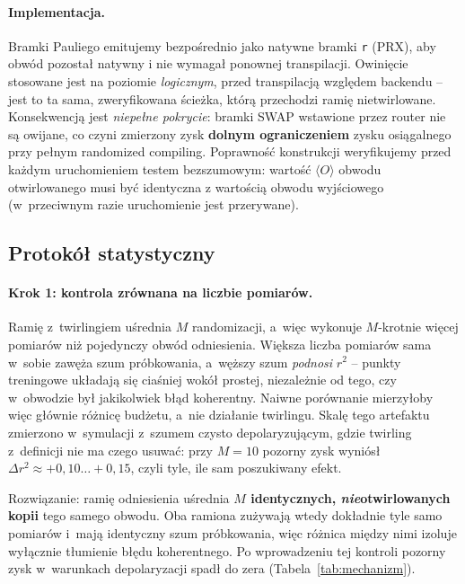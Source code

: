 \documentclass[11pt]{article}
\newcommand{\expv}{\langle O\rangle}
\begin{document}
\paragraph{Implementacja.} Bramki Pauliego emitujemy bezpośrednio jako natywne bramki \texttt{r}
(PRX), aby obwód pozostał natywny i nie wymagał ponownej transpilacji. Owinięcie stosowane jest na poziomie \emph{logicznym}, przed
transpilacją względem backendu -- jest to ta sama, zweryfikowana ścieżka, którą przechodzi ramię
nietwirlowane. Konsekwencją jest \emph{niepełne pokrycie}: bramki SWAP wstawione przez router nie są
owijane, co czyni zmierzony zysk \textbf{dolnym ograniczeniem} zysku osiągalnego przy pełnym
randomized compiling. Poprawność konstrukcji weryfikujemy przed każdym uruchomieniem testem
bezszumowym: wartość $\expv$ obwodu otwirlowanego musi być identyczna z wartością obwodu wyjściowego
(w~przeciwnym razie uruchomienie jest przerywane).

\subsection{Protokół statystyczny}\label{sec:protokol}

\paragraph{Krok 1: kontrola zrównana na liczbie pomiarów.} Ramię z~twirlingiem uśrednia $M$
randomizacji, a~więc wykonuje $M$-krotnie więcej pomiarów niż pojedynczy obwód odniesienia. Większa
liczba pomiarów sama w~sobie zawęża szum próbkowania, a~węższy szum \emph{podnosi} $r^2$ -- punkty
treningowe układają się ciaśniej wokół prostej, niezależnie od tego, czy w~obwodzie był jakikolwiek
błąd koherentny. Naiwne porównanie mierzyłoby więc głównie różnicę budżetu, a~nie działanie
twirlingu. Skalę tego artefaktu zmierzono w~symulacji z~szumem czysto depolaryzującym, gdzie
twirling z~definicji nie ma czego usuwać: przy $M=10$ pozorny zysk wyniósł $\Delta r^2 \approx
+0{,}10\ldots+0{,}15$, czyli tyle, ile sam poszukiwany efekt.

Rozwiązanie: ramię odniesienia uśrednia \textbf{$M$ identycznych, \emph{nie}otwirlowanych kopii}
tego samego obwodu. Oba ramiona zużywają wtedy dokładnie tyle samo pomiarów i~mają identyczny szum
próbkowania, więc różnica między nimi izoluje wyłącznie tłumienie błędu koherentnego. Po
wprowadzeniu tej kontroli pozorny zysk w~warunkach depolaryzacji spadł do zera
(Tabela~\ref{tab:mechanizm}).
\end{document}
